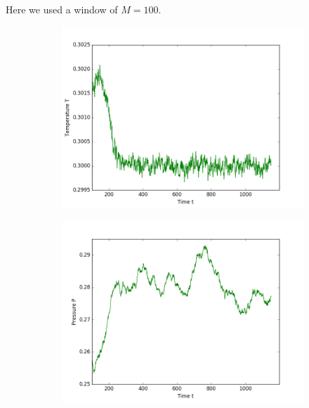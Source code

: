 Here we used a window of $M = 100$.
\begin{figure}[ht]
\begin{subfigure}{0.3\textwidth}
\includegraphics[width=\textwidth]{fig/avTemperature_T0d3_F20d0_M100.png}
\end{subfigure}
\hfill
\begin{subfigure}{0.3\textwidth}
\includegraphics[width=\textwidth]{fig/avPressure_T0d3_F20d0_M100.png}
\end{subfigure}
\hfill
\begin{subfigure}{0.3\textwidth}

\end{subfigure}
\end{figure}
